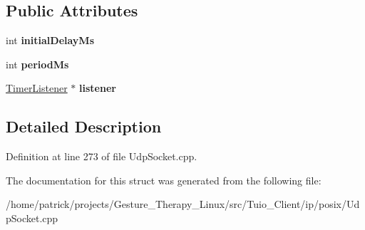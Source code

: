 \subsection*{Public Attributes}
\begin{DoxyCompactItemize}
\item 
\mbox{\label{struct_attached_timer_listener_aa64bc119fd970428daac476270c1e14a}} 
int {\bfseries initial\+Delay\+Ms}
\item 
\mbox{\label{struct_attached_timer_listener_ae6e9daa49d5bcf31861b10135392d314}} 
int {\bfseries period\+Ms}
\item 
\mbox{\label{struct_attached_timer_listener_aff3d3ad95a91c4f8015661c380931db4}} 
\hyperlink{class_timer_listener}{Timer\+Listener} $\ast$ {\bfseries listener}
\end{DoxyCompactItemize}


\subsection{Detailed Description}


Definition at line 273 of file Udp\+Socket.\+cpp.



The documentation for this struct was generated from the following file\+:\begin{DoxyCompactItemize}
\item 
/home/patrick/projects/\+Gesture\+\_\+\+Therapy\+\_\+\+Linux/src/\+Tuio\+\_\+\+Client/ip/posix/Udp\+Socket.\+cpp\end{DoxyCompactItemize}
